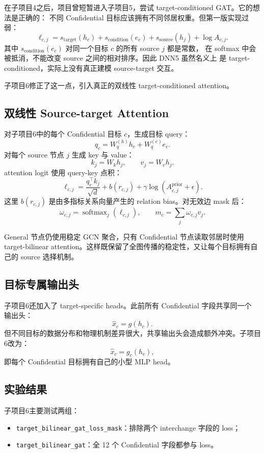 \documentclass[UTF8,a4paper,11pt]{ctexart}
\begin{document}
在子项目4之后，项目曾短暂进入子项目5，尝试 target-conditioned GAT。它的想法是正确的：
不同 Confidential 目标应该拥有不同邻居权重。但第一版实现过弱：
\[
  \ell_{c,j}
  =
  s_{\text{target}}(h_c)
  +
  s_{\text{condition}}(e_c)
  +
  s_{\text{source}}(h_j)
  +
  \log A_{c,j}.
\]
其中 $s_{\text{condition}}(e_c)$ 对同一个目标 $c$ 的所有 source $j$ 都是常数，
在 softmax 中会被抵消，不能改变 source 之间的相对排序。因此 DNN5 虽然名义上
是 target-conditioned，实际上没有真正建模 source-target 交互。

子项目6修正了这一点，引入真正的双线性 target-conditioned attention。

\subsection{双线性 Source-target Attention}

对子项目6中的每个 Confidential 目标 $c$，生成目标 query：
\[
  q_c = W_q^{(h)} h_c + W_q^{(e)} e_c.
\]
对每个 source 节点 $j$ 生成 key 与 value：
\[
  k_j = W_k h_j, \qquad v_j = W_v h_j.
\]
attention logit 使用 query-key 点积：
\[
  \ell_{c,j}
  =
  \frac{q_c^\top k_j}{\sqrt{d}}
  +
  b(r_{c,j})
  +
  \gamma \log(A_{c,j}^{\text{prior}} + \epsilon).
\]
这里 $b(r_{c,j})$ 是由多指标关系向量产生的 relation bias。对无效边 mask 后：
\[
  \omega_{c,j}
  =
  \operatorname{softmax}_j(\ell_{c,j}),
  \qquad
  m_c = \sum_j \omega_{c,j} v_j.
\]

General 节点仍使用稳定 GCN 聚合，只有 Confidential 节点读取邻居时使用
target-bilinear attention。这样既保留了全图传播的稳定性，又让每个目标拥有自己的
source 选择机制。

\subsection{目标专属输出头}

子项目6还加入了 target-specific heads。此前所有 Confidential 字段共享同一个
输出头：
\[
  \hat{x}_c = g(h_c).
\]
但不同目标的数据分布和物理机制差异很大，共享输出头会造成额外冲突。子项目6改为：
\[
  \hat{x}_c = g_c(h_c),
\]
即每个 Confidential 目标拥有自己的小型 MLP head。

\subsection{实验结果}

子项目6主要测试两组：
\begin{itemize}
  \item \texttt{target\_bilinear\_gat\_loss\_mask}：排除两个 interchange 字段的 loss；
  \item \texttt{target\_bilinear\_gat}：全 12 个 Confidential 字段都参与 loss。
\end{itemize}
\end{document}
